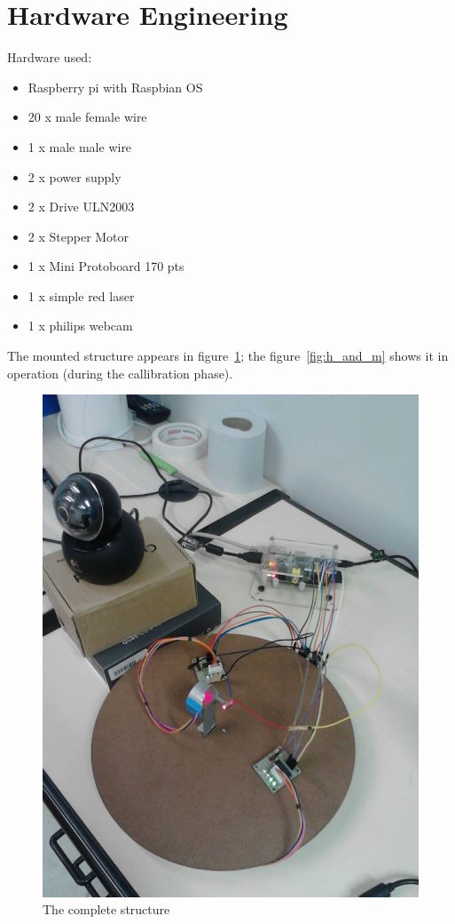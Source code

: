 \documentclass{article}
\begin{document}
\section{Hardware Engineering}

Hardware used:
\begin{itemize}
    \item Raspberry pi with Raspbian OS
    \item 20 x male female wire
    \item 1 x male male wire
    \item 2 x power supply
    \item 2 x Drive ULN2003
    \item 2 x Stepper Motor
    \item 1 x Mini Protoboard 170 pts
    \item 1 x simple red laser
    \item 1 x philips webcam
\end{itemize}

The mounted structure appears in figure~\ref{fig:hardware};
the figure~\ref{fig:h_and_m} shows it in operation
(during the callibration phase).

\begin{figure}[h!]
    \includegraphics[scale=0.2]{imgs/hardware.jpg}
    \caption{The complete structure}
    \label{fig:hardware}
\end{figure}
\end{document}
